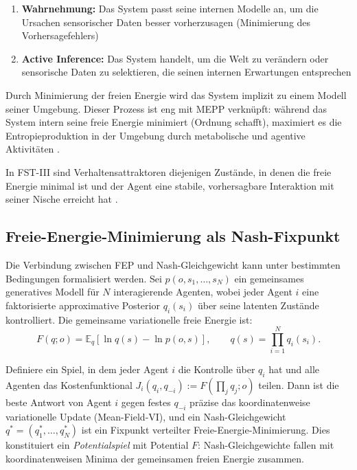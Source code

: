 \documentclass[12pt,a4paper]{article}
\theoremstyle{remark}
\begin{document}
\begin{enumerate}
    \item \textbf{Wahrnehmung:} Das System passt seine internen Modelle an, um die Ursachen sensorischer Daten besser vorherzusagen (Minimierung des Vorhersagefehlers) \citep{FristonFreeEnergy}
    \item \textbf{Active Inference:} Das System handelt, um die Welt zu ver\"andern oder sensorische Daten zu selektieren, die seinen internen Erwartungen entsprechen \citep{FristonFreeEnergy}
\end{enumerate}

Durch Minimierung der freien Energie wird das System implizit zu einem Modell seiner Umgebung. Dieser Prozess ist eng mit MEPP verkn\"upft: w\"ahrend das System intern seine freie Energie minimiert (Ordnung schafft), maximiert es die Entropieproduktion in der Umgebung durch metabolische und agentive Aktivit\"aten \citep{FristonPDF}.

In FST-III sind Verhaltensattraktoren diejenigen Zust\"ande, in denen die freie Energie minimal ist und der Agent eine stabile, vorhersagbare Interaktion mit seiner Nische erreicht hat \citep{FristonFreeEnergy}.

\subsection{Freie-Energie-Minimierung als Nash-Fixpunkt}

Die Verbindung zwischen FEP und Nash-Gleichgewicht kann unter bestimmten Bedingungen formalisiert werden. Sei $p(o,s_1,\dots,s_N)$ ein gemeinsames generatives Modell f\"ur $N$ interagierende Agenten, wobei jeder Agent $i$ eine faktorisierte approximative Posterior $q_i(s_i)$ \"uber seine latenten Zust\"ande kontrolliert. Die gemeinsame variationelle freie Energie ist:
\begin{equation}
F(q; o) = \mathbb{E}_q\!\left[\ln q(s) - \ln p(o, s)\right], \qquad q(s) = \prod_{i=1}^{N} q_i(s_i).
\end{equation}

Definiere ein Spiel, in dem jeder Agent $i$ die Kontrolle \"uber $q_i$ hat und alle Agenten das Kostenfunktional $J_i(q_i, q_{-i}) := F(\prod_j q_j; o)$ teilen. Dann ist die beste Antwort von Agent $i$ gegen festes $q_{-i}$ pr\"azise das koordinatenweise variationelle Update (Mean-Field-VI), und ein Nash-Gleichgewicht $q^* = (q_1^*, \dots, q_N^*)$ ist ein Fixpunkt verteilter Freie-Energie-Minimierung. Dies konstituiert ein \emph{Potentialspiel} mit Potential $F$: Nash-Gleichgewichte fallen mit koordinatenweisen Minima der gemeinsamen freien Energie zusammen.
\end{document}
